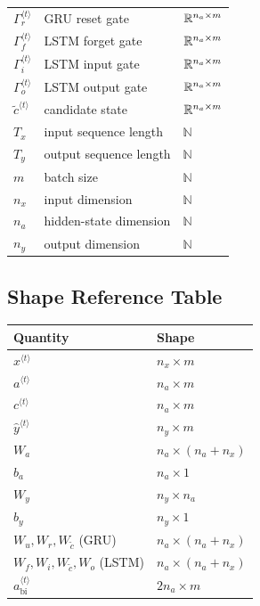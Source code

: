 \begin{center}
\begin{tabular}{lll}
$\Gamma_r^{\langle t\rangle}$ & GRU reset gate & $\mathbb{R}^{n_a \times m}$ \\
$\Gamma_f^{\langle t\rangle}$ & LSTM forget gate & $\mathbb{R}^{n_a \times m}$ \\
$\Gamma_i^{\langle t\rangle}$ & LSTM input gate & $\mathbb{R}^{n_a \times m}$ \\
$\Gamma_o^{\langle t\rangle}$ & LSTM output gate & $\mathbb{R}^{n_a \times m}$ \\
$\widetilde{c}^{\langle t\rangle}$ & candidate state & $\mathbb{R}^{n_a \times m}$ \\
$T_x$ & input sequence length & $\mathbb{N}$ \\
$T_y$ & output sequence length & $\mathbb{N}$ \\
$m$ & batch size & $\mathbb{N}$ \\
$n_x$ & input dimension & $\mathbb{N}$ \\
$n_a$ & hidden-state dimension & $\mathbb{N}$ \\
$n_y$ & output dimension & $\mathbb{N}$ \\
\bottomrule
\end{tabular}
\end{center}

\subsection{Shape Reference Table}

\begin{center}
\begin{tabular}{ll}
\toprule
Quantity & Shape \\
\midrule
$x^{\langle t\rangle}$ & $n_x \times m$ \\
$a^{\langle t\rangle}$ & $n_a \times m$ \\
$c^{\langle t\rangle}$ & $n_a \times m$ \\
$\hat{y}^{\langle t\rangle}$ & $n_y \times m$ \\
$W_a$ & $n_a \times (n_a+n_x)$ \\
$b_a$ & $n_a \times 1$ \\
$W_y$ & $n_y \times n_a$ \\
$b_y$ & $n_y \times 1$ \\
$W_u,W_r,W_{\tilde{c}}$ (GRU) & $n_a \times (n_a+n_x)$ \\
$W_f,W_i,W_{\tilde{c}},W_o$ (LSTM) & $n_a \times (n_a+n_x)$ \\
$a_{\mathrm{bi}}^{\langle t\rangle}$ & $2n_a \times m$ \\
\bottomrule
\end{tabular}
\end{center}
